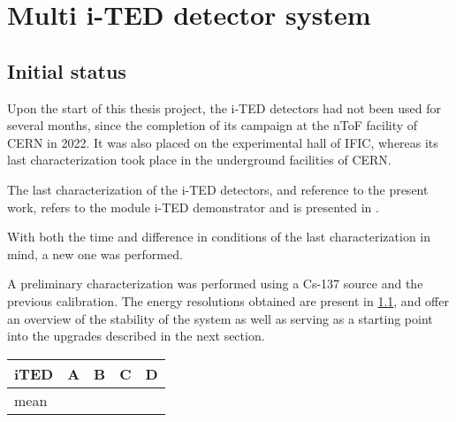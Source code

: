 \chapter{Multi i-TED detector system}\label{ch:multi-ited}

\section{Initial status}\label{sec:initial}

Upon the start of this thesis project, the \ac{i-TED} detectors had not been used for several months, since the completion of its campaign at the \ac{nToF} facility of \ac{CERN} in 2022. It was also placed on the experimental hall of \ac{IFIC}, whereas its last characterization took place in the underground facilities of \ac{CERN}.

The last characterization of the \ac{i-TED} detectors, and reference to the present work, refers to the module \ac{i-TED} demonstrator and is presented in \cite{BABIANO_PHD_THESIS}.

With both the time and difference in conditions of the last characterization in mind, a new one was performed.

A preliminary characterization was performed using a Cs-137 source and the previous calibration. The energy resolutions obtained are present in \ref{table:initial_res}, and offer an overview of the stability of the system as well as serving as a starting point into the upgrades described in the next section.

\begin{table}[h!]
    \begin{tabular}{lrrrr}
        \toprule
        iTED &    A &    B &    C &    D \\
        \midrule
        mean &  &  &  &  \\
        \bottomrule
    \end{tabular}
    \label{table:initial_res}
\end{table}

